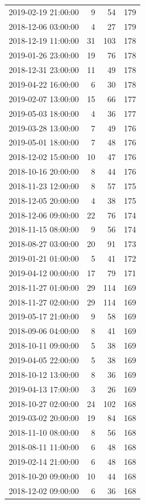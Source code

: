 \begin{tabular}{lrrr}
2019-02-19 21:00:00 & 9 & 54 & 179 \\
2018-12-06 03:00:00 & 4 & 27 & 179 \\
2018-12-19 11:00:00 & 31 & 103 & 178 \\
2019-01-26 23:00:00 & 19 & 76 & 178 \\
2018-12-31 23:00:00 & 11 & 49 & 178 \\
2019-04-22 16:00:00 & 6 & 30 & 178 \\
2019-02-07 13:00:00 & 15 & 66 & 177 \\
2019-05-03 18:00:00 & 4 & 36 & 177 \\
2019-03-28 13:00:00 & 7 & 49 & 176 \\
2019-05-01 18:00:00 & 7 & 48 & 176 \\
2018-12-02 15:00:00 & 10 & 47 & 176 \\
2018-10-16 20:00:00 & 8 & 44 & 176 \\
2018-11-23 12:00:00 & 8 & 57 & 175 \\
2018-12-05 20:00:00 & 4 & 38 & 175 \\
2018-12-06 09:00:00 & 22 & 76 & 174 \\
2018-11-15 08:00:00 & 9 & 56 & 174 \\
2018-08-27 03:00:00 & 20 & 91 & 173 \\
2019-01-21 01:00:00 & 5 & 41 & 172 \\
2019-04-12 00:00:00 & 17 & 79 & 171 \\
2018-11-27 01:00:00 & 29 & 114 & 169 \\
2018-11-27 02:00:00 & 29 & 114 & 169 \\
2019-05-17 21:00:00 & 9 & 58 & 169 \\
2018-09-06 04:00:00 & 8 & 41 & 169 \\
2018-10-11 09:00:00 & 5 & 38 & 169 \\
2019-04-05 22:00:00 & 5 & 38 & 169 \\
2018-10-12 13:00:00 & 8 & 36 & 169 \\
2019-04-13 17:00:00 & 3 & 26 & 169 \\
2018-10-27 02:00:00 & 24 & 102 & 168 \\
2019-03-02 20:00:00 & 19 & 84 & 168 \\
2018-11-10 08:00:00 & 8 & 56 & 168 \\
2018-08-11 11:00:00 & 6 & 48 & 168 \\
2019-02-14 21:00:00 & 6 & 48 & 168 \\
2018-10-20 09:00:00 & 10 & 44 & 168 \\
2018-12-02 09:00:00 & 6 & 36 & 168 \\

\end{tabular}
